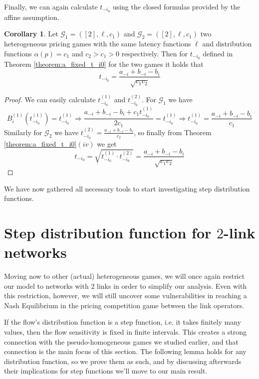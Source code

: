 \documentclass[10pt,a4paper]{book}
\newcommand{\Gm}{\mathcal{G}}
\theoremstyle{definition}
\newtheorem{corollary}[definition]{Corollary}
\theoremstyle{comment}
\begin{document}
Finally, we can again calculate $t_{-i_0}$ using the closed formulas provided by the affine assumption.

\begin{corollary}
	\label{corollary:a_fixed_ti0_calc}
	Let $\Gm_1 = ([2], \ell, c_1)$ and $\Gm_2 = ([2], \ell, c_1)$ two heterogeneous pricing games with the same latency functions $\ell$ and distribution functions $\alpha(p) = c_1$ and $c_2 > c_1 > 0$ respectively.
	Then for $t_{-i_0}$ defined in Theorem \ref{theorem:a_fixed_t_i0} for the two games it holds that
	\[t_{-i_0} = \frac{a_{-i} + b_{-i} - b_i}{\sqrt{c_1 c_2}}\]
\end{corollary}

\begin{proof}
	We can easily calculate $t_{-i_0}^{(1)}$ and $t_{-i_0}^{(2)}$.
	For $\Gm_1$ we have
	\[B_i^{(1)}(t_{-i_0}^{(1)}) = t_{-i_0}^{(1)} \Rightarrow \frac{a_{-i} + b_{-i} - b_i + c_1 t_{-i_0}^{(1)}}{2 c_1} = t_{-i_0}^{(1)} \Rightarrow t_{-i_0}^{(1)} = \frac{a_{-i} + b_{-i} - b_i}{c_1}\]
	Similarly for $\Gm_2$ we have $t_{-i_0}^{(2)} = \frac{a_{-i} + b_{-i} - b_i}{c_2}$, so finally from Theorem \ref{theorem:a_fixed_t_i0}$(iv)$ we get
	\[t_{-i_0} = \sqrt{t_{-i_0}^{(1)} \cdot t_{-i_0}^{(2)}} = \frac{a_{-i} + b_{-i} - b_i}{\sqrt{c_1 c_2}}\]
\end{proof}
We have now gathered all necessary tools to start investigating step distribution functions.

\section{Step distribution function for $2$-link networks}

Moving now to other (actual) heterogeneous games, we will once again restrict our model to networks with $2$ links in order to simplify our analysis.
Even with this restriction, however, we will still uncover some vulnerabilities in reaching a Nash Equilibrium in the pricing competition game between the link operators.

If the flow's distribution function is a step function, i.e. it takes finitely many values, then the flow sensitivity is fixed in finite intervals.
This creates a strong connection with the pseudo-homogeneous games we studied earlier, and that connection is the main focus of this section.
The following lemma holds for any distribution function, so we prove them as such, and by discussing afterwards their implications for step functions we'll move to our main result.
\end{document}

